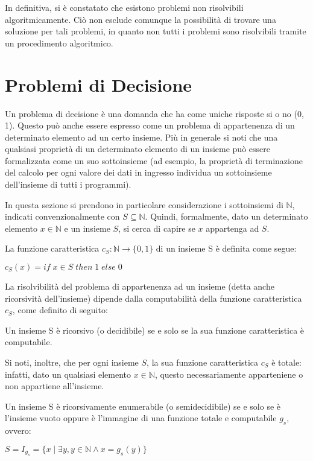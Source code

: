   In definitiva, si è constatato che esistono problemi non risolvibili algoritmicamente. Ciò non esclude comunque la possibilità di trovare una soluzione per tali problemi, in quanto non tutti i problemi sono risolvibili tramite un procedimento algoritmico. 

  \section{Problemi di Decisione}
  Un problema di decisione è una domanda che ha come uniche risposte si o no (0, 1). Questo può anche essere espresso come un problema di appartenenza di un determinato elemento ad un certo insieme. Più in generale si noti che una qualsiasi proprietà di un determinato elemento di un insieme può essere formalizzata come un suo sottoinsieme (ad esempio, la proprietà di terminazione del calcolo per ogni valore dei dati in ingresso individua un sottoinsieme dell'insieme di tutti i programmi). 
  
  In questa sezione si prendono in particolare considerazione i sottoinsiemi di \(\mathbb N\), indicati convenzionalmente con \(S\subseteq\mathbb{N}\). Quindi, formalmente, dato un determinato elemento \(x\in\mathbb{N}\) e un insieme \(S\), si cerca di capire se \(x\) appartenga ad \(S\).

  \begin{definition}
    La funzione caratteristica \(c_S:\mathbb{N}\to\{0,1\}\) di un insieme S è definita come segue:

    \(c_S(x)=if\;x\in S\;then\;1\;else\;0\)
  \end{definition}

  La risolvibilità del problema di appartenenza ad un insieme (detta anche ricorsività dell'insieme) dipende dalla computabilità della funzione caratteristica \(c_S\), come definito di seguito:

  \begin{definition}
    Un insieme S è ricorsivo (o decidibile) se e solo se la sua funzione caratteristica è computabile.
  \end{definition}

  Si noti, inoltre, che per ogni insieme \(S\), la sua funzione caratteristica \(c_S\) è totale: infatti, dato un qualsiasi elemento \(x\in\mathbb{N}\), questo necessariamente apparteniene o non appartiene all'insieme.
  
  \begin{definition}
    Un insieme S è ricorsivamente enumerabile (o semidecidibile) se e solo se è l'insieme vuoto oppure è l'immagine di una funzione totale e computabile \(g_s\), ovvero:

    \(S=I_{g_s} = \{x\;|\;\exists y, y\in\mathbb{N} \land x=g_s(y)\}\)
  \end{definition}

